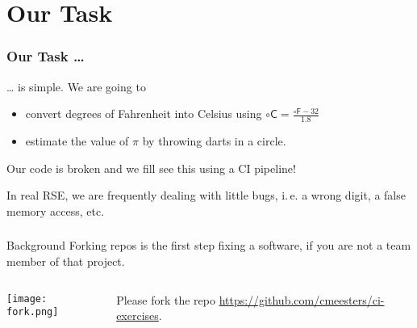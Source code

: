 \section{Our Task}
{   
}

\begin{frame}
	\frametitle{Our Task \ldots}
	\ldots
	is simple. We are going to
	\begin{itemize}
		\item convert degrees of Fahrenheit into Celsius using $\circ\mathsf{C} = \frac{\circ\mathsf{F} - 32}{1.8}$
		\item estimate the value of $\pi$ by throwing darts in a circle.
	\end{itemize}
    Our code is broken and we fill see this using a CI pipeline!
    \pause
    \begin{question}
    	{In real RSE, we are frequently dealing with little bugs, i.\,e. a wrong digit, a false memory access, etc.}
    \end{question}
\end{frame}

\begin{frame}
	\frametitle{}
	\begin{block}{Background}
		{Forking repos is the first step fixing a software, if you are not a team member of that project.}
	\end{block}
	\pause
	\begin{columns}
		\begin{column}{0.5\textwidth}
			\texttt{[image: fork.png]}
		\end{column}
		\begin{column}{0.5\textwidth}
			Please fork the repo \url{https://github.com/cmeesters/ci-exercises}.
		\end{column}
	\end{columns}
\end{frame}

